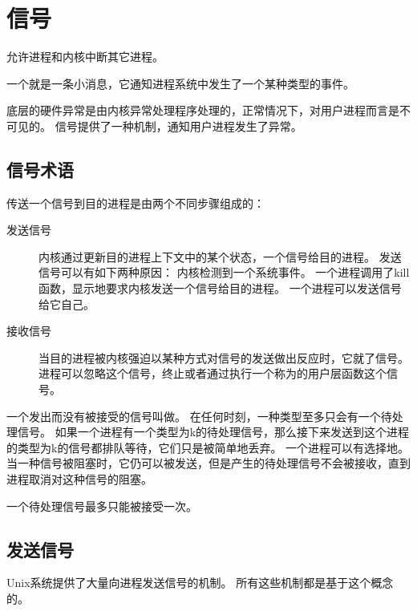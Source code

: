 
\section{信号}
{
    允许进程和内核中断其它进程。

    一个就是一条小消息，它通知进程系统中发生了一个某种类型的事件。

    底层的硬件异常是由内核异常处理程序处理的，正常情况下，对用户进程而言是不可见的。
    信号提供了一种机制，通知用户进程发生了异常。

    \subsection{信号术语}
    {
        传送一个信号到目的进程是由两个不同步骤组成的：

        \begin{description}
            \item[发送信号]
            {
                内核通过更新目的进程上下文中的某个状态，一个信号给目的进程。
                发送信号可以有如下两种原因：
                内核检测到一个系统事件。
                一个进程调用了kill函数，显示地要求内核发送一个信号给目的进程。
                一个进程可以发送信号给它自己。
            }
            \item[接收信号]
            {
                当目的进程被内核强迫以某种方式对信号的发送做出反应时，它就了信号。
                进程可以忽略这个信号，终止或者通过执行一个称为的用户层函数这个信号。
            }
        \end{description}

        一个发出而没有被接受的信号叫做。
        在任何时刻，一种类型至多只会有一个待处理信号。
        如果一个进程有一个类型为k的待处理信号，那么接下来发送到这个进程的类型为k的信号都排队等待，它们只是被简单地丢弃。
        一个进程可以有选择地。
        当一种信号被阻塞时，它仍可以被发送，但是产生的待处理信号不会被接收，直到进程取消对这种信号的阻塞。

        一个待处理信号最多只能被接受一次。
    }

    \subsection{发送信号}
    {
        Unix系统提供了大量向进程发送信号的机制。
        所有这些机制都是基于这个概念的。

}}
